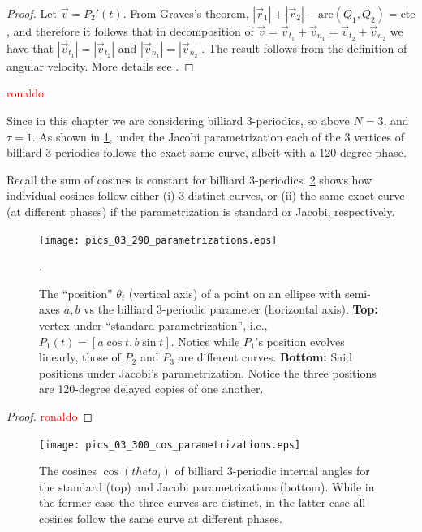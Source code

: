 \begin{proof} Let $\vec v=P_2'(t)$. From Graves's theorem, $|\vec r_1|+|\vec r_2|-\text{arc}(Q_1,Q_2)=\text{cte}$,  and therefore it follows that in decomposition of $\vec v=\vec v_{t_1}+\vec v_{n_1}=\vec v_{t_2}+\vec v_{n_2}$ we have that $|\vec v_{t_1}|=|\vec v_{t_2}|$ and  $|\vec v_{n_1}|=|\vec v_{n_2}|$. The result follows from the   definition of angular velocity. More details see \cite{stachel2021-billiards-param}.
\end{proof}
 
\textcolor{red}{ronaldo}
 
Since in this chapter we are considering billiard 3-periodics, so above $N=3$, and $\tau=1$. As shown in \cref{fig:03-jacobi-param}, under the Jacobi parametrization each of the 3 vertices of billiard 3-periodics follows the exact same curve, albeit with a 120-degree phase.

Recall the sum of cosines is constant for billiard 3-periodics. \cref{fig:03-jacobi-cos-param} shows how individual cosines follow either (i) 3-distinct curves, or (ii) the same exact curve (at different phases) if the parametrization is standard or Jacobi, respectively.

\begin{figure}
    \centering
    \texttt{[image: pics\_03\_290\_parametrizations.eps]}
    \caption{The ``position'' $\theta_i$ (vertical axis) of a point on an ellipse with semi-axes $a,b$ vs the billiard 3-periodic parameter (horizontal axis). \textbf{Top:} vertex  under ``standard parametrization'', i.e., $P_1(t)=[a\cos{t},b\sin{t}]$. Notice while $P_1$'s position evolves linearly, those of $P_2$ and $P_3$ are different curves. \textbf{Bottom:} Said positions under Jacobi's parametrization. Notice the three positions are 120-degree delayed copies of one another.}. 
    \label{fig:03-jacobi-param}
\end{figure}

\begin{proof}
\textcolor{red}{ronaldo}
\end{proof}
\begin{figure}
    \centering
    \texttt{[image: pics\_03\_300\_cos\_parametrizations.eps]}
    \caption{The cosines $\cos(theta_i)$ of billiard 3-periodic internal angles for the standard (top) and Jacobi parametrizations (bottom). While in the former case the three curves are distinct, in the latter case all cosines follow the same curve at different phases.}
    \label{fig:03-jacobi-cos-param}
\end{figure}
